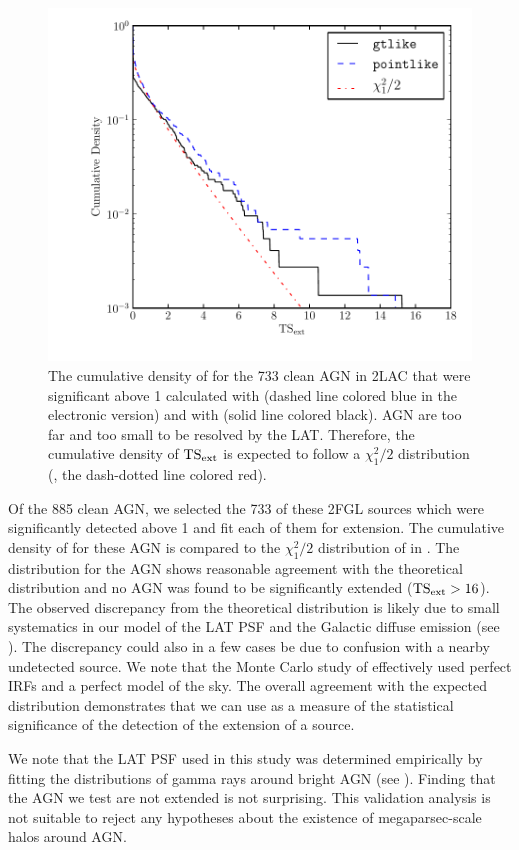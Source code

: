 \begin{figure}[htbp]
  \includegraphics{chapters/extended_analysis/figures/source_plots/agn_color.pdf}
  \caption{The cumulative density of \tsext for the 733 clean AGN in 2LAC
  that were significant above 1 \gev calculated with \pointlike (dashed
  line colored blue in the electronic version) and with \gtlike (solid
  line colored black).  AGN are too far and too small to be resolved
  by the LAT. Therefore, the cumulative density of $\mathrm{TS}_\mathrm{ext}$ is expected
  to follow a $\chi^2_1/2$ distribution (,
  the dash-dotted line colored red).}
\end{figure}

Of the 885 clean AGN, we selected the 733 of these 2FGL sources which
were significantly detected above 1 \gev and fit each of them for
extension.  The cumulative density of \tsext for these AGN is compared
to the $\chi^2_1/2$ distribution of 
in .  The \tsext distribution for the AGN shows
reasonable agreement with the theoretical distribution and no AGN
was found to be significantly extended ($\mathrm{TS}_\mathrm{ext}>16$).  The observed
discrepancy from the theoretical distribution is likely due to small
systematics in our model of the LAT PSF and the Galactic diffuse emission
(see ).  The discrepancy could
also in a few cases be due to confusion with a nearby undetected source.
We note that the Monte Carlo study of 
effectively used perfect IRFs and a perfect model of the sky.  The overall
agreement with the expected distribution demonstrates that we can use
\tsext as a measure of the statistical significance of the detection of
the extension of a source.

We note that the LAT PSF used in this study was determined empirically
by fitting the distributions of gamma rays around bright AGN (see
). Finding that the AGN we test
are not extended is not surprising.  This validation analysis is not
suitable to reject any hypotheses about the existence of megaparsec-scale
halos around AGN.
